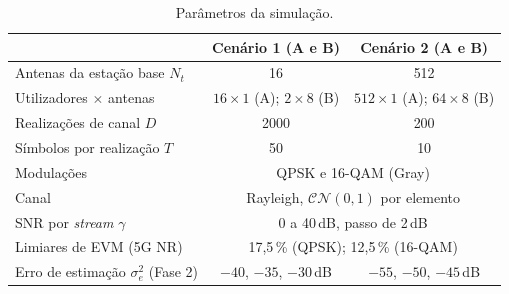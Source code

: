 \begin{table}[H]
  \centering
  \caption{Parâmetros da simulação.}
  \label{tab:param}
  \begin{tabular}{@{}lcc@{}}
    \toprule
    & Cenário 1 (A e B) & Cenário 2 (A e B) \\
    \midrule
    Antenas da estação base $N_t$ & 16 & 512 \\
    Utilizadores $\times$ antenas & $16\times1$ (A); $2\times8$ (B) & $512\times1$ (A); $64\times8$ (B) \\
    Realizações de canal $D$ & 2000 & 200 \\
    Símbolos por realização $T$ & 50 & 10 \\
    \midrule
    Modulações & \multicolumn{2}{c}{QPSK e 16-QAM (Gray)} \\
    Canal & \multicolumn{2}{c}{Rayleigh, $\mathcal{CN}(0,1)$ por elemento} \\
    SNR por \emph{stream} $\gamma$ & \multicolumn{2}{c}{0 a 40\,dB, passo de 2\,dB} \\
    Limiares de EVM (5G NR) & \multicolumn{2}{c}{17,5\,\% (QPSK); 12,5\,\% (16-QAM)} \\
    Erro de estimação $\sigma_e^2$ (Fase 2) & $-40$, $-35$, $-30$\,dB & $-55$, $-50$, $-45$\,dB \\
    \bottomrule
  \end{tabular}
\end{table}


